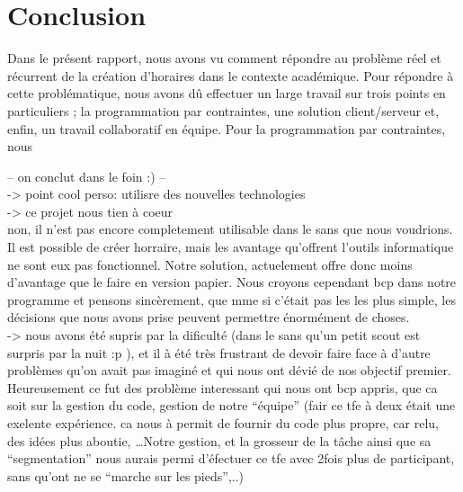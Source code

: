 \chapter*{Conclusion}

Dans le présent rapport, nous avons vu comment répondre au problème réel et récurrent de la création d'horaires dans le contexte académique. Pour répondre à cette problématique, nous avons dû effectuer un large travail sur trois points en particuliers ; la programmation par contraintes, une solution client/serveur et, enfin, un travail collaboratif en équipe.
\newline
\indent
Pour la programmation par contraintes, nous 

-- on conclut dans le foin :) --\\

->  point cool perso: utilisre des nouvelles technologies \\

->  ce projet nous tien à coeur \\
non, il n'est pas encore completement utilisable dans le sans que nous voudrions.
Il est possible de créer horraire, mais les avantage qu'offrent l'outils informatique ne sont eux pas fonctionnel. Notre solution, actuelement offre donc moins d'avantage que le faire en version papier.  Nous croyons cependant bcp dans notre programme et pensons sincèrement, que mme si c'était pas les les plus simple, les décisions que nous avons prise peuvent permettre énormément de choses.  \\

-> nous avons été supris par la dificulté (dans le sans qu'un petit scout est
surpris par la nuit :p ), et il à été très frustrant de devoir faire face à
d'autre problèmes qu'on avait pas imaginé et qui nous ont dévié de nos objectif
premier.  Heureusement ce fut des problème interessant qui nous ont bcp appris,
que ca soit sur la gestion du code, gestion de notre ``équipe'' (fair ce tfe à
deux était une exelente expérience. ca nous à permit de fournir du code plus
propre, car relu, des idées plus aboutie, \ldots Notre gestion, et la grosseur
de la tâche ainsi que sa ``segmentation'' nous aurais permi d'éfectuer ce tfe
avec 2fois plus de participant, sans qu'ont ne se ``marche sur les pieds'',..)
